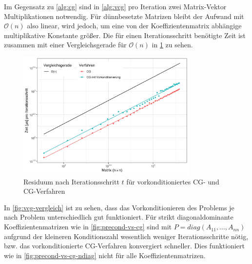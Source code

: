 \documentclass[12pt,a4paper]{scrartcl}
\numberwithin{equation}{section}
\numberwithin{myalgctr}{section}
\numberwithin{mytheoremctr}{subsection}
\numberwithin{mykorollarctr}{subsection}
\numberwithin{mylemmactr}{subsection}
\numberwithin{mybeispielctr}{subsection}
\begin{document}
	Im Gegensatz zu \cref{alg:cg}  sind in \cref{alg:vcg} pro Iteration zwei Matrix-Vektor Multiplikationen notwendig. F\"ur d\"unnbesetzte Matrizen bleibt der Aufwand mit $\mathcal{O}(n)$ also linear, wird jedoch, um eine  von der Koeffizientenmatrix abh\"angige multiplikative Konstante gr\"o\ss er. Die f\"ur einen Iterationsschritt ben\"otigte Zeit ist zusammen mit einer Vergleichsgerade f\"ur $\mathcal{O}(n)$ in \cref{fig:precond-vs-cg-complexity} zu sehen. 
	
	\begin{figure}[H]
		\begin{center}
			\includegraphics[width=0.8\textwidth]{../plots/precond-vs-cg-complexity.png}
		\end{center}
		\caption{Residuum nach Iterationsschritt $t$ f\"ur vorkonditioniertes CG- und CG-Verfahren }
		\label{fig:precond-vs-cg-complexity}	
	\end{figure}
	
	In \cref{fig:vcg-vergleich} ist zu sehen, dass das Vorkonditionieren des Problems je nach Problem unterschiedlich gut funktioniert.
	F\"ur strikt diagonaldominante Koeffizientenmatrizen wie in \cref{fig:precond-vs-cg} sind mit $P = diag(A_{11}, \ldots, A_{nn})$ aufgrund der kleineren Konditionszahl wesentlich weniger Iterationsschritte n\"otig, bzw. das vorkonditionierte CG-Verfahren konvergiert schneller. Dies funktioniert wie in \cref{fig:precond-vs-cg-ndiag} nicht f\"ur alle Koeffizientenmatrizen.
		
\end{document}
